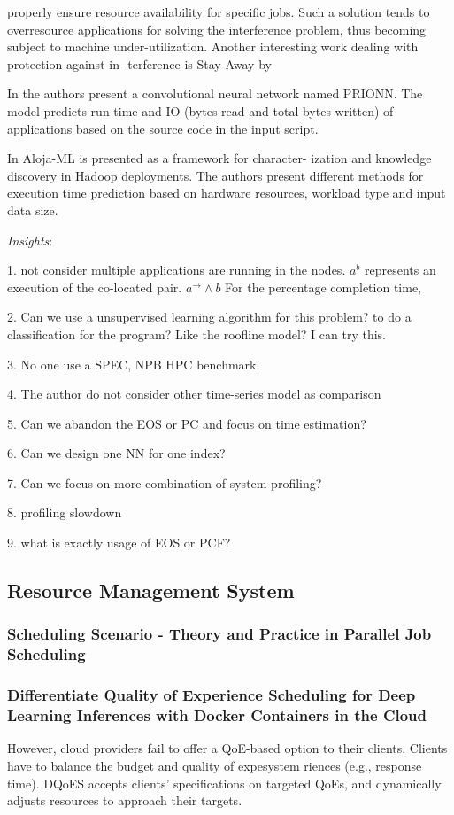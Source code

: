 \documentclass[UTF8]{article}
\begin{document}
properly ensure resource availability for specific jobs. Such a solution tends to overresource applications for solving the interference problem, thus becoming subject to machine under-utilization. Another interesting work dealing with protection against in- terference is Stay-Away by \cite{rameshan2014stay}

In \cite{wyatt2018prionn} the authors present a convolutional neural network named PRIONN. The model predicts run-time and IO (bytes read and total bytes written) of applications based on the source code in the input script. 

In \cite{berral2015aloja} Aloja-ML is presented as a framework for character- ization and knowledge discovery in Hadoop deployments. The authors present different methods for execution time prediction based on hardware resources, workload type and input data size.

\emph{Insights}: 

1. not consider multiple applications are running in the nodes. $a^b$ represents an execution of the co-located pair. $a^{\rightarrow} \wedge b$ For the percentage completion time, 

2. Can we use a unsupervised learning algorithm for this problem?  to do a classification for the program?  Like the roofline model? I can try this.

3. No one use a SPEC, NPB HPC benchmark.

4. The author do not consider other time-series model as comparison

5. Can we abandon the EOS or PC and focus on time estimation?

6. Can we design one NN for one index?

7. Can we focus on more combination of system profiling?

8. profiling slowdown

9. what is exactly usage of EOS or PCF?

\subsection{Resource Management System}
\subsubsection{Scheduling Scenario - Theory and Practice in Parallel Job Scheduling}
\subsubsection{Differentiate Quality of Experience Scheduling for Deep Learning Inferences with Docker Containers in the Cloud}
However, cloud providers fail to offer a QoE-based option to their clients. Clients have to balance the budget and quality of expesystem
riences (e.g., response time). DQoES accepts clients’ specifications on targeted QoEs, and dynamically adjusts resources to approach their targets. 
\end{document}
